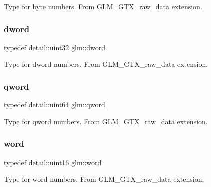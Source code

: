 Type for byte numbers. From G\+L\+M\+\_\+\+G\+T\+X\+\_\+raw\+\_\+data extension. \mbox{\label{group__gtx__raw__data_ga1fc2589df6d44e923cd1820cf14805cf}} 
\subsubsection{\texorpdfstring{dword}{dword}}
{\footnotesize\ttfamily typedef \hyperlink{namespaceglm_1_1detail_ade6cfbf377022aaa391af8cd50489222}{detail\+::uint32} \hyperlink{group__gtx__raw__data_ga1fc2589df6d44e923cd1820cf14805cf}{glm\+::dword}}

Type for dword numbers. From G\+L\+M\+\_\+\+G\+T\+X\+\_\+raw\+\_\+data extension. \mbox{\label{group__gtx__raw__data_ga32447af289e879589883c9b7e3be1246}} 
\subsubsection{\texorpdfstring{qword}{qword}}
{\footnotesize\ttfamily typedef \hyperlink{namespaceglm_1_1detail_adec4b19bf4982125e122db2fe03c5810}{detail\+::uint64} \hyperlink{group__gtx__raw__data_ga32447af289e879589883c9b7e3be1246}{glm\+::qword}}

Type for qword numbers. From G\+L\+M\+\_\+\+G\+T\+X\+\_\+raw\+\_\+data extension. \mbox{\label{group__gtx__raw__data_ga5617a479d471021b5c773c5e969ba46d}} 
\subsubsection{\texorpdfstring{word}{word}}
{\footnotesize\ttfamily typedef \hyperlink{namespaceglm_1_1detail_a47b2a7d006d187338e8031a352d1ce56}{detail\+::uint16} \hyperlink{group__gtx__raw__data_ga5617a479d471021b5c773c5e969ba46d}{glm\+::word}}

Type for word numbers. From G\+L\+M\+\_\+\+G\+T\+X\+\_\+raw\+\_\+data extension. 